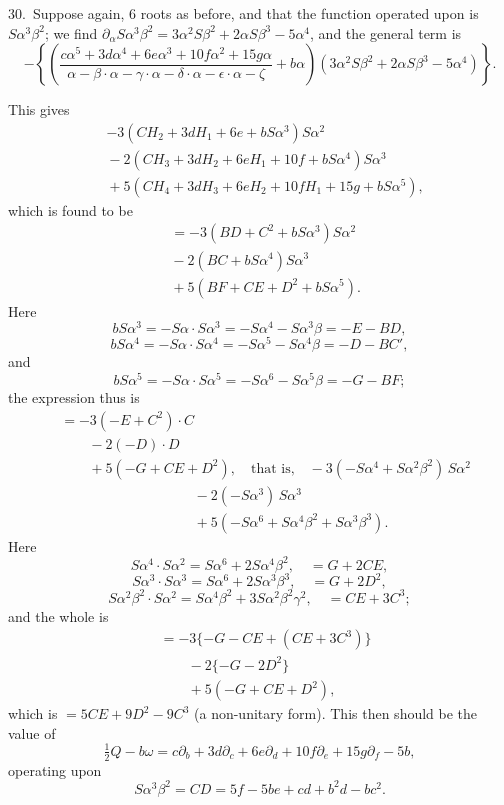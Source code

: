 \documentclass[11pt]{article}
\begin{document}
30.\ Suppose again, 6 roots as before, and that the function operated upon is $S\alpha^3\beta^2$; we find $\partial_\alpha S\alpha^3\beta^2 = 3\alpha^2 S\beta^2 + 2\alpha S\beta^3 - 5\alpha^4$, and the general term is
\[
-\left\{\left(\frac{c\alpha^5 + 3d\alpha^4 + 6e\alpha^3 + 10f\alpha^2 + 15g\alpha}{\alpha - \beta\cdot\alpha - \gamma\cdot\alpha - \delta\cdot\alpha - \epsilon\cdot\alpha - \zeta} + b\alpha\right)(3\alpha^2 S\beta^2 + 2\alpha S\beta^3 - 5\alpha^4)\right\}.
\]

This gives
\begin{align*}
& -3(CH_2 + 3dH_1 + 6e + bS\alpha^3) S\alpha^2 \\
& {} - 2(CH_3 + 3dH_2 + 6eH_1 + 10f + bS\alpha^4) S\alpha^3 \\
& {} + 5(CH_4 + 3dH_3 + 6eH_2 + 10fH_1 + 15g + bS\alpha^5),
\end{align*}
which is found to be
\begin{align*}
& = -3(BD + C^2 + bS\alpha^3) S\alpha^2 \\
& {} - 2(BC + bS\alpha^4) S\alpha^3 \\
& {} + 5(BF + CE + D^2 + bS\alpha^5).
\end{align*}
Here
\[
bS\alpha^3 = -S\alpha\cdot S\alpha^3 = -S\alpha^4 - S\alpha^3\beta = -E - BD,
\]
\[
bS\alpha^4 = -S\alpha\cdot S\alpha^4 = -S\alpha^5 - S\alpha^4\beta = -D - BC',
\]
and
\[
bS\alpha^5 = -S\alpha\cdot S\alpha^5 = -S\alpha^6 - S\alpha^5\beta = -G - BF;
\]
the expression thus is
\begin{align*}
& = -3(-E + C^2)\cdot C \\
& \qquad -2(-D)\cdot D \\
& \qquad +5(-G + CE + D^2),\quad \text{that is,}\quad -3(-S\alpha^4 + S\alpha^2\beta^2)\,S\alpha^2 \\
&\hspace{4cm}-2(-S\alpha^3)\,S\alpha^3 \\
&\hspace{4cm}+5(-S\alpha^6 + S\alpha^4\beta^2 + S\alpha^3\beta^3).
\end{align*}
Here
\[
S\alpha^4\cdot S\alpha^2 = S\alpha^6 + 2S\alpha^4\beta^2,\quad = G + 2CE,
\]
\[
S\alpha^3\cdot S\alpha^3 = S\alpha^6 + 2S\alpha^3\beta^3,\quad = G + 2D^2,
\]
\[
S\alpha^2\beta^2\cdot S\alpha^2 = S\alpha^4\beta^2 + 3S\alpha^2\beta^2\gamma^2,\quad = CE + 3C^3;
\]
and the whole is
\begin{align*}
& = -3\{-G - CE + (CE + 3C^3)\} \\
& \qquad -2\{-G - 2D^2\} \\
& \qquad + 5(-G + CE + D^2),
\end{align*}
which is $= 5CE + 9D^2 - 9C^3$ (a non-unitary form). This then should be the value of
\[
\tfrac{1}{2}Q - b\omega = c\partial_b + 3d\partial_c + 6e\partial_d + 10f\partial_e + 15g\partial_f - 5b,
\]
operating upon
\[
S\alpha^3\beta^2 = CD = 5f - 5be + cd + b^2d - bc^2.
\]
\end{document}
